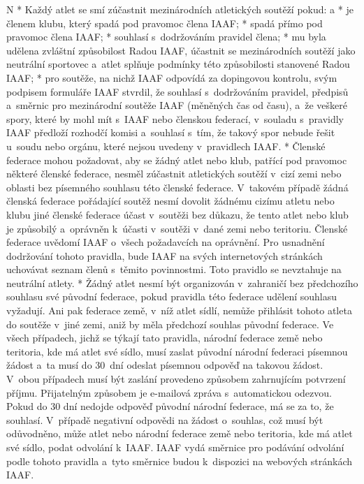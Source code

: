 \begitems \style N
* Každý atlet se smí zúčastnit mezinárodních atletických soutěží pokud:
  \begitems \style a
  * je členem klubu, který spadá pod pravomoc člena IAAF;
  * spadá přímo pod pravomoc člena IAAF;
  * souhlasí s~dodržováním pravidel člena;
  * mu byla udělena zvláštní způsobilost Radou IAAF, účastnit  se mezinárodních soutěží jako neutrální sportovec a~atlet splňuje podmínky této způsobilosti stanovené Radou IAAF;
  * pro soutěže, na nichž IAAF odpovídá za dopingovou kontrolu, svým podpisem formuláře IAAF stvrdil, že souhlasí s~dodržováním pravidel, předpisů a~směrnic pro mezinárodní soutěže IAAF (měněných čas od času), a~že veškeré spory, které by mohl mít s~IAAF nebo členskou federací, v~souladu s~pravidly IAAF předloží rozhodčí komisi a~souhlasí s~tím, že takový spor nebude řešit u~soudu nebo orgánu, které nejsou uvedeny v~pravidlech IAAF.
  \enditems
* Členské federace mohou požadovat, aby se žádný atlet nebo klub, patřící pod pravomoc některé členské federace, nesměl zúčastnit atletických soutěží v~cizí zemi nebo oblasti bez písemného souhlasu této členské federace. V~takovém případě žádná členská federace pořádající soutěž nesmí dovolit žádnému cizímu atletu nebo klubu jiné členské federace účast v~soutěži bez důkazu, že tento atlet nebo klub je způsobilý a~oprávněn k~účasti v~soutěži v~dané zemi nebo teritoriu. Členské federace uvědomí IAAF o~všech požadavcích na oprávnění. Pro usnadnění dodržování tohoto pravidla, bude IAAF na svých internetových stránkách uchovávat seznam členů s~těmito povinnostmi. Toto pravidlo se nevztahuje na neutrální atlety.
* Žádný atlet nesmí být organizován v~zahraničí bez předchozího souhlasu své původní federace, pokud pravidla této federace udělení souhlasu vyžadují. Ani pak federace země, v~níž atlet sídlí, nemůže přihlásit tohoto atleta do soutěže v~jiné zemi, aniž by měla předchozí souhlas původní federace. Ve všech případech, jichž se týkají tato pravidla, národní federace země nebo teritoria, kde má atlet své sídlo, musí zaslat původní národní federaci písemnou žádost a~ta musí do 30~dní odeslat písemnou odpověď na takovou žádost. V~obou případech musí být zaslání provedeno způsobem zahrnujícím potvrzení příjmu. Přijatelným způsobem je e-mailová zpráva s~automatickou odezvou. Pokud do 30 dní nedojde odpověď původní národní federace, má se za to, že souhlasí. V~případě negativní odpovědi na žádost o~souhlas, což musí být odůvodněno, může atlet nebo národní federace země nebo teritoria, kde má atlet své sídlo, podat odvolání k~IAAF. IAAF vydá směrnice pro podávání odvolání podle tohoto pravidla a~tyto směrnice budou k~dispozici na webových stránkách IAAF.
\enditems

